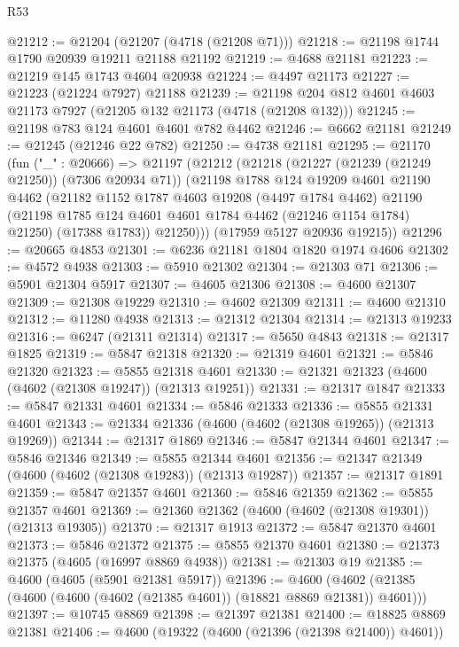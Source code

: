 \begin{lexlean}{R53}
\begin{coremodule}
@21212 := @21204 (@21207 (@4718 (@21208 @71)))
@21218 := @21198 @1744 @1790 @20939 @19211 @21188 @21192
@21219 := @4688 @21181
@21223 := @21219 @145 @1743 @4604 @20938
@21224 := @4497 @21173
@21227 := @21223 (@21224 @7927) @21188
@21239 := @21198 @204 @812 @4601 @4603 @21173 @7927 (@21205 @132 @21173 (@4718 (@21208 @132)))
@21245 := @21198 @783 @124 @4601 @4601 @782 @4462
@21246 := @6662 @21181
@21249 := @21245 (@21246 @22 @782)
@21250 := @4738 @21181
@21295 := @21170
    (fun ("_" : @20666) =>
    @21197
      (@21212
        (@21218
          (@21227 (@21239 (@21249 @21250)) (@7306 @20934 @71))
          (@21198
            @1788
            @124
            @19209
            @4601
            @21190
            @4462
            (@21182
              @1152
              @1787
              @4603
              @19208
              (@4497 @1784 @4462)
              @21190
              (@21198 @1785 @124 @4601 @4601 @1784 @4462 (@21246 @1154 @1784) @21250)
              (@17388 @1783))
            @21250)))
      (@17959 @5127 @20936 @19215))
@21296 := @20665 @4853
@21301 := @6236 @21181 @1804 @1820 @1974 @4606
@21302 := @4572 @4938
@21303 := @5910 @21302
@21304 := @21303 @71
@21306 := @5901 @21304 @5917
@21307 := @4605 @21306
@21308 := @4600 @21307
@21309 := @21308 @19229
@21310 := @4602 @21309
@21311 := @4600 @21310
@21312 := @11280 @4938
@21313 := @21312 @21304
@21314 := @21313 @19233
@21316 := @6247 (@21311 @21314)
@21317 := @5650 @4843
@21318 := @21317 @1825
@21319 := @5847 @21318
@21320 := @21319 @4601
@21321 := @5846 @21320
@21323 := @5855 @21318 @4601
@21330 := @21321 @21323 (@4600 (@4602 (@21308 @19247)) (@21313 @19251))
@21331 := @21317 @1847
@21333 := @5847 @21331 @4601
@21334 := @5846 @21333
@21336 := @5855 @21331 @4601
@21343 := @21334 @21336 (@4600 (@4602 (@21308 @19265)) (@21313 @19269))
@21344 := @21317 @1869
@21346 := @5847 @21344 @4601
@21347 := @5846 @21346
@21349 := @5855 @21344 @4601
@21356 := @21347 @21349 (@4600 (@4602 (@21308 @19283)) (@21313 @19287))
@21357 := @21317 @1891
@21359 := @5847 @21357 @4601
@21360 := @5846 @21359
@21362 := @5855 @21357 @4601
@21369 := @21360 @21362 (@4600 (@4602 (@21308 @19301)) (@21313 @19305))
@21370 := @21317 @1913
@21372 := @5847 @21370 @4601
@21373 := @5846 @21372
@21375 := @5855 @21370 @4601
@21380 := @21373 @21375 (@4605 (@16997 @8869 @4938))
@21381 := @21303 @19
@21385 := @4600 (@4605 (@5901 @21381 @5917))
@21396 := @4600 (@4602 (@21385 (@4600 (@4600 (@4602 (@21385 @4601)) (@18821 @8869 @21381)) @4601)))
@21397 := @10745 @8869
@21398 := @21397 @21381
@21400 := @18825 @8869 @21381
@21406 := @4600 (@19322 (@4600 (@21396 (@21398 @21400)) @4601))

\end{coremodule}
\end{lexlean}
